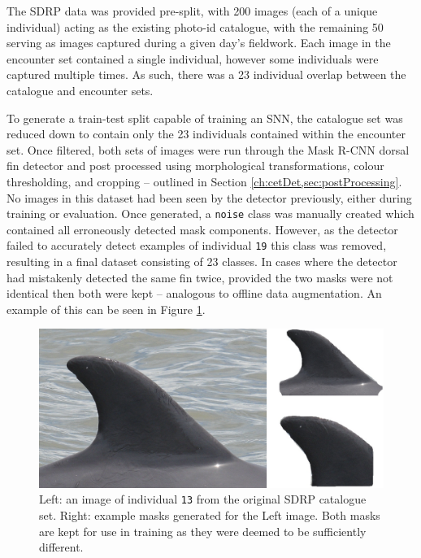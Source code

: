 The SDRP data was provided pre-split, with 200 images (each of a unique individual) acting as the existing photo-id catalogue, with the remaining 50 serving as images captured during a given day's fieldwork. Each image in the encounter set contained a single individual, however some individuals were captured multiple times. As such, there was a 23 individual overlap between the catalogue and encounter sets. 

To generate a train-test split capable of training an SNN, the catalogue set was reduced down to contain only the 23 individuals contained within the encounter set. Once filtered, both sets of images were run through the Mask R-CNN dorsal fin detector and post processed using morphological transformations, colour thresholding, and cropping -- outlined in Section \ref{ch:cetDet,sec:postProcessing}. No images in this dataset had been seen by the detector previously, either during training or evaluation. Once generated, a \texttt{noise} class was manually created which contained all erroneously detected mask components. However, as the detector failed to accurately detect examples of individual \texttt{19} this class was removed, resulting in a final dataset consisting of 23 classes. In cases where the detector had mistakenly detected the same fin twice, provided the two masks were not identical then both were kept -- analogous to offline data augmentation. An example of this can be seen in Figure \ref{fig:sdrp-double-mask-eg}.

\begin{figure}
	\begin{center}
		\includegraphics[scale=0.5]{Chapter6/figs/SDRP-double-mask-eg-indv-13.png}
	\end{center}
	\caption[Left: an image of individual \texttt{13} from the original SDRP catalogue set. Right: example masks generated for the Left image.]{Left: an image of individual \texttt{13} from the original SDRP catalogue set. Right: example masks generated for the Left image. Both masks are kept for use in training as they were deemed to be sufficiently different.}
	\label{fig:sdrp-double-mask-eg}
\end{figure}

